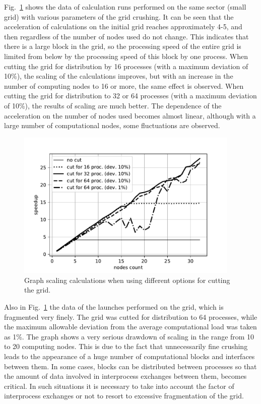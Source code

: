 \documentclass[
11pt,%
tightenlines,%
twoside,%
onecolumn,%
nofloats,%
nobibnotes,%
nofootinbib,%
superscriptaddress,%
noshowpacs,%
centertags]%
{revtex4}
\begin{document}
Fig.~\ref{fig:plot_36_scaling_2} shows the data of calculation runs performed on the same sector (small grid) with various parameters of the grid crushing.
It can be seen that the acceleration of calculations on the initial grid reaches approximately 4-5, and then regardless of the number of nodes used do not change.
This indicates that there is a large block in the grid, so the processing speed of the entire grid is limited from below by the processing speed of this block by one process.
When cutting the grid for distribution by 16 processes (with a maximum deviation of 10\%), the scaling of the calculations improves, but with an increase in the number of computing nodes to 16 or more, the same effect is observed.
When cutting the grid for distribution to 32 or 64 processes (with a maximum deviation of 10\%), the results of scaling are much better.
The dependence of the acceleration on the number of nodes used becomes almost linear, although with a large number of computational nodes, some fluctuations are observed.

\begin{figure}[h]
\setcaptionmargin{5mm}
\onelinecaptionstrue
\includegraphics[width=0.95\textwidth]{pics/plot_36_scaling_2.pdf}
\caption{Graph scaling calculations when using different options for cutting the grid.}
\label{fig:plot_36_scaling_2}
\end{figure}

Also in Fig.~\ref{fig:plot_36_scaling_2} the data of the launches performed on the grid, which is fragmented very finely.
The grid was cutted for distribution to 64 processes, while the maximum allowable deviation from the average computational load was taken as 1\%.
The graph shows a very serious drawdown of scaling in the range from 10 to 20 computing nodes.
This is due to the fact that unnecessarily fine crushing leads to the appearance of a huge number of computational blocks and interfaces between them.
In some cases, blocks can be distributed between processes so that the amount of data involved in interprocess exchanges between them, becomes critical.
In such situations it is necessary to take into account the factor of interprocess exchanges or not to resort to excessive fragmentation of the grid.
\end{document}
